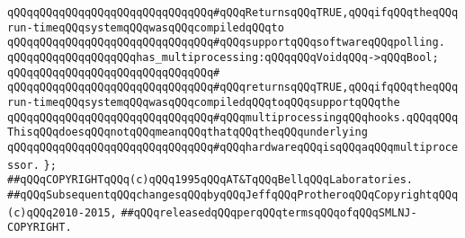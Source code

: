 \verb|qQQqqQQqqQQqqQQqqQQqqQQqqQQqqQQq#qQQqReturnsqQQqTRUE,qQQqifqQQqtheqQQqrun-timeqQQqsystemqQQqwasqQQqcompiledqQQqto|\newline
\verb|qQQqqQQqqQQqqQQqqQQqqQQqqQQqqQQq#qQQqsupportqQQqsoftwareqQQqpolling.|\newline
\newline
\newline
\verb|qQQqqQQqqQQqqQQqqQQqhas_multiprocessing:qQQqqQQqVoidqQQq->qQQqBool;|\newline
\verb|qQQqqQQqqQQqqQQqqQQqqQQqqQQqqQQq#|\newline
\verb|qQQqqQQqqQQqqQQqqQQqqQQqqQQqqQQq#qQQqreturnsqQQqTRUE,qQQqifqQQqtheqQQqrun-timeqQQqsystemqQQqwasqQQqcompiledqQQqtoqQQqsupportqQQqthe|\newline
\verb|qQQqqQQqqQQqqQQqqQQqqQQqqQQqqQQq#qQQqmultiprocessingqQQqhooks.qQQqqQQqThisqQQqdoesqQQqnotqQQqmeanqQQqthatqQQqtheqQQqunderlying|\newline
\verb|qQQqqQQqqQQqqQQqqQQqqQQqqQQqqQQq#qQQqhardwareqQQqisqQQqaqQQqmultiprocessor.|\newline
\verb|};|\newline
\newline
\newline
\verb|##qQQqCOPYRIGHTqQQq(c)qQQq1995qQQqAT&TqQQqBellqQQqLaboratories.|\newline
\verb|##qQQqSubsequentqQQqchangesqQQqbyqQQqJeffqQQqProtheroqQQqCopyrightqQQq(c)qQQq2010-2015,|\newline
\verb|##qQQqreleasedqQQqperqQQqtermsqQQqofqQQqSMLNJ-COPYRIGHT.|\newline

